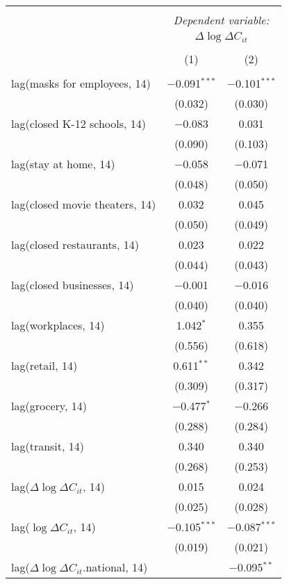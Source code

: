 \begin{tabular}{@{\extracolsep{1pt}}lcc} 
\\[-1.8ex]\hline 
\hline \\[-1.8ex] 
 & \multicolumn{2}{c}{\textit{Dependent variable:}} \\ 
\cline{2-3} 
 & \multicolumn{2}{c}{$\Delta \log \Delta C_{it}$} \\ 
\\[-1.8ex] & (1) & (2)\\ 
\hline \\[-1.8ex] 
 lag(masks for employees, 14) & $-$0.091$^{***}$ & $-$0.101$^{***}$ \\ 
  & (0.032) & (0.030) \\ 
  lag(closed K-12 schools, 14) & $-$0.083 & 0.031 \\ 
  & (0.090) & (0.103) \\ 
  lag(stay at home, 14) & $-$0.058 & $-$0.071 \\ 
  & (0.048) & (0.050) \\ 
  lag(closed movie theaters, 14) & 0.032 & 0.045 \\ 
  & (0.050) & (0.049) \\ 
  lag(closed restaurants, 14) & 0.023 & 0.022 \\ 
  & (0.044) & (0.043) \\ 
  lag(closed businesses, 14) & $-$0.001 & $-$0.016 \\ 
  & (0.040) & (0.040) \\ 
  lag(workplaces, 14) & 1.042$^{*}$ & 0.355 \\ 
  & (0.556) & (0.618) \\ 
  lag(retail, 14) & 0.611$^{**}$ & 0.342 \\ 
  & (0.309) & (0.317) \\ 
  lag(grocery, 14) & $-$0.477$^{*}$ & $-$0.266 \\ 
  & (0.288) & (0.284) \\ 
  lag(transit, 14) & 0.340 & 0.340 \\ 
  & (0.268) & (0.253) \\ 
  lag($\Delta \log \Delta C_{it}$, 14) & 0.015 & 0.024 \\ 
  & (0.025) & (0.028) \\ 
  lag($\log \Delta C_{it}$, 14) & $-$0.105$^{***}$ & $-$0.087$^{***}$ \\ 
  & (0.019) & (0.021) \\ 
  lag($\Delta \log \Delta C_{it}$.national, 14) &  & $-$0.095$^{**}$ \\ 

\end{tabular}
